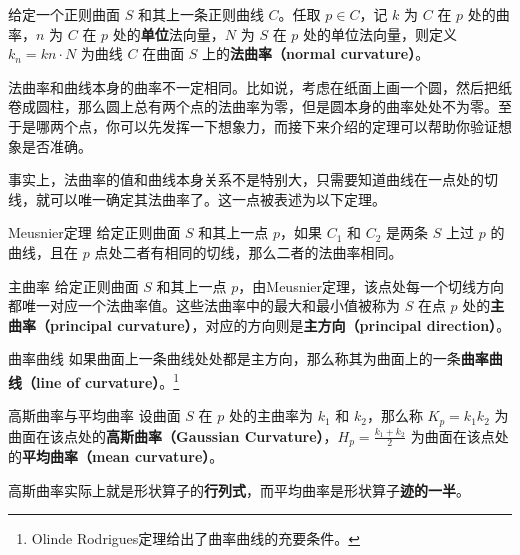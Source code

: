 




\begin{definition}{}
给定一个正则曲面 $S$ 和其上一条正则曲线 $C$。任取 $p\in C$，记 $k$ 为 $C$ 在 $p$ 处的曲率，$n$ 为 $C$ 在 $p$ 处的\textbf{单位}法向量，$N$ 为 $S$ 在 $p$ 处的单位法向量，则定义 $k_n=kn\cdot N$ 为曲线 $C$ 在曲面 $S$ 上的\textbf{法曲率（normal curvature）}。
\end{definition}

法曲率和曲线本身的曲率不一定相同。比如说，考虑在纸面上画一个圆，然后把纸卷成圆柱，那么圆上总有两个点的法曲率为零，但是圆本身的曲率处处不为零。至于是哪两个点，你可以先发挥一下想象力，而接下来介绍的定理可以帮助你验证想象是否准确。

事实上，法曲率的值和曲线本身关系不是特别大，只需要知道曲线在一点处的切线，就可以唯一确定其法曲率了。这一点被表述为以下定理。

\begin{theorem}{Meusnier定理}
给定正则曲面 $S$ 和其上一点 $p$，如果 $C_1$ 和 $C_2$ 是两条 $S$ 上过 $p$ 的曲线，且在 $p$ 点处二者有相同的切线，那么二者的法曲率相同。
\end{theorem}

\begin{definition}{主曲率}
给定正则曲面 $S$ 和其上一点 $p$，由Meusnier定理，该点处每一个切线方向都唯一对应一个法曲率值。这些法曲率中的最大和最小值被称为 $S$ 在点 $p$ 处的\textbf{主曲率（principal curvature）}，对应的方向则是\textbf{主方向（principal direction）}。
\end{definition}

\begin{definition}{曲率曲线}
如果曲面上一条曲线处处都是主方向，那么称其为曲面上的一条\textbf{曲率曲线（line of curvature）}。\footnote{Olinde Rodrigues定理给出了曲率曲线的充要条件。}
\end{definition}

\begin{definition}{高斯曲率与平均曲率}
设曲面 $S$ 在 $p$ 处的主曲率为 $k_1$ 和 $k_2$，那么称 $K_p=k_1k_2$ 为曲面在该点处的\textbf{高斯曲率（Gaussian Curvature）}，$H_p=\frac{k_1+k_2}{2}$ 为曲面在该点处的\textbf{平均曲率（mean curvature）}。
\end{definition}

高斯曲率实际上就是形状算子的\textbf{行列式}，而平均曲率是形状算子\textbf{迹的一半}。

